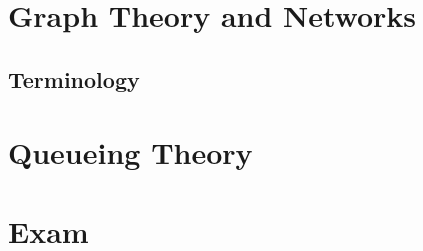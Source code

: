 \chapter{Graph Theory and Networks}
\section{Terminology}



\chapter{Queueing Theory}


\chapter{Exam}


%



